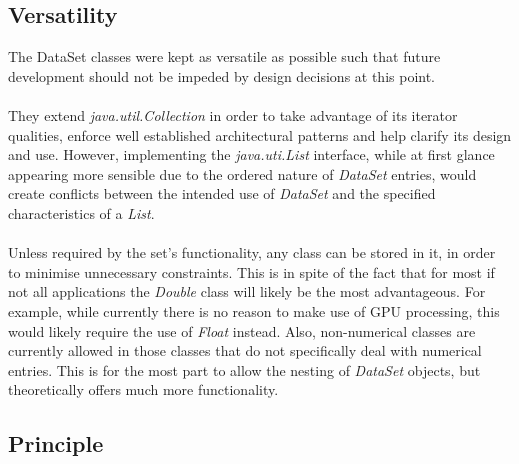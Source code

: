 \documentclass[main.tex]{subfiles}
\begin{document}
    \subsection{Versatility}
    
      The DataSet classes were kept as versatile as possible such that future development should not be impeded by design decisions at this point. 
      \\\\
      They extend \textit{java.util.Collection} in order to take advantage of its iterator qualities, enforce well established architectural patterns and help clarify its design and use. However, implementing the \textit{java.uti.List} interface, while at first glance appearing more sensible due to the ordered nature of \textit{DataSet} entries, would create conflicts between the intended use of  \textit{DataSet} and the specified characteristics of a \textit{List}.
      \\\\
      Unless required by the set's functionality, any class can be stored in it, in order to minimise unnecessary constraints. This is in spite of the fact that for most if not all applications the \textit{Double} class will likely be the most advantageous. For example, while currently there is no reason to make use of GPU processing, this would likely require the use of \textit{Float} instead. Also, non-numerical classes are currently allowed in those classes that do not specifically deal with numerical entries. This is for the most part to allow the nesting of \textit{DataSet} objects, but theoretically offers much more functionality.
    
    \subsection{Principle}
      
\end{document}
